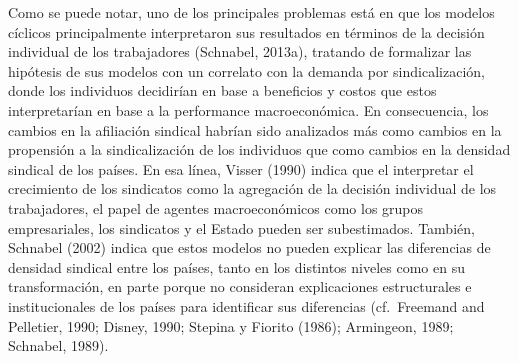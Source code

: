 \documentclass[
]{book}
\begin{document}
Como se puede notar, uno de los principales problemas está en que los modelos cíclicos principalmente interpretaron sus resultados en términos de la decisión individual de los trabajadores (Schnabel, 2013a), tratando de formalizar las hipótesis de sus modelos con un correlato con la demanda por sindicalización, donde los individuos decidirían en base a beneficios y costos que estos interpretarían en base a la performance macroeconómica. En consecuencia, los cambios en la afiliación sindical habrían sido analizados más como cambios en la propensión a la sindicalización de los individuos que como cambios en la densidad sindical de los países. En esa línea, Visser (1990) indica que el interpretar el crecimiento de los sindicatos como la agregación de la decisión individual de los trabajadores, el papel de agentes macroeconómicos como los grupos empresariales, los sindicatos y el Estado pueden ser subestimados. También, Schnabel (2002) indica que estos modelos no pueden explicar las diferencias de densidad sindical entre los países, tanto en los distintos niveles como en su transformación, en parte porque no consideran explicaciones estructurales e institucionales de los países para identificar sus diferencias (cf.~Freemand and Pelletier, 1990; Disney, 1990; Stepina y Fiorito (1986); Armingeon, 1989; Schnabel, 1989).
\end{document}
